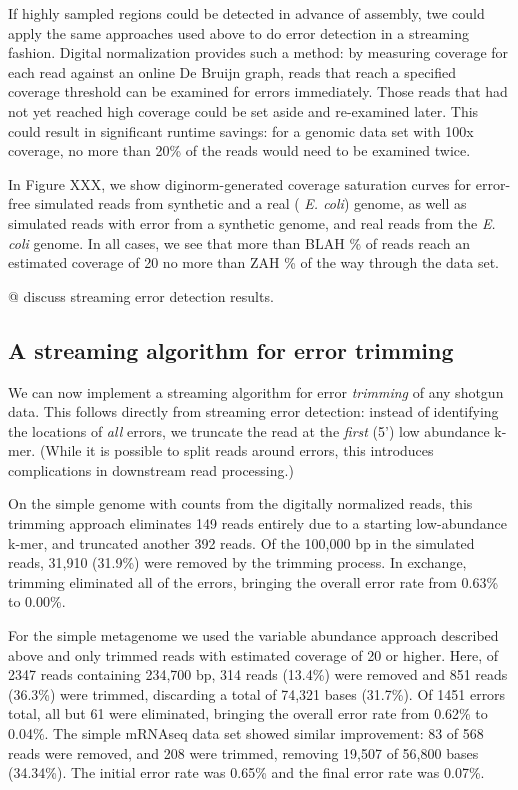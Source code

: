 If highly sampled regions could be detected in advance of assembly,
twe could apply the same approaches used above to do error detection
in a streaming fashion.  Digital normalization provides such a method:
by measuring coverage for each read against an online De Bruijn graph,
reads that reach a specified coverage threshold can be examined for
errors immediately.  Those reads that had not yet reached high
coverage could be set aside and re-examined later.  This could result
in significant runtime savings: for a genomic data set with 100x
coverage, no more than 20\% of the reads would need to be examined
twice.

In Figure XXX, we show diginorm-generated coverage saturation curves
for error-free simulated reads from synthetic and a real ({\em
  E. coli}) genome, as well as simulated reads with error from a
synthetic genome, and real reads from the {\em E. coli} genome.  In
all cases, we see that more than BLAH \% of reads reach an estimated
coverage of 20 no more than ZAH \% of the way through the data set.

@ discuss streaming error detection results.

\subsection{A streaming algorithm for error trimming}

We can now implement a streaming algorithm for error {\em trimming} of
any shotgun data.  This follows directly from streaming error
detection: instead of identifying the locations of {\em all} errors,
we truncate the read at the {\em first} (5') low abundance k-mer.
(While it is possible to split reads around errors, this introduces
complications in downstream read processing.)

On the simple genome with counts from the digitally normalized reads,
this trimming approach eliminates 149 reads entirely due to a starting
low-abundance k-mer, and truncated another 392 reads.  Of the 100,000
bp in the simulated reads, 31,910 (31.9\%) were removed by the
trimming process.  In exchange, trimming eliminated all of the errors,
bringing the overall error rate from 0.63\% to 0.00\%.

For the simple metagenome we used the variable abundance approach
described above and only trimmed reads with estimated coverage of 20
or higher.  Here, of 2347 reads containing 234,700 bp, 314 reads
(13.4\%) were removed and 851 reads (36.3\%) were trimmed, discarding
a total of 74,321 bases (31.7\%).  Of 1451 errors total, all but 61
were eliminated, bringing the overall error rate from 0.62\% to
0.04\%.  The simple mRNAseq data set showed similar improvement: 83 of
568 reads were removed, and 208 were trimmed, removing 19,507 of
56,800 bases (34.34\%).  The initial error rate was 0.65\% and the
final error rate was 0.07\%.


